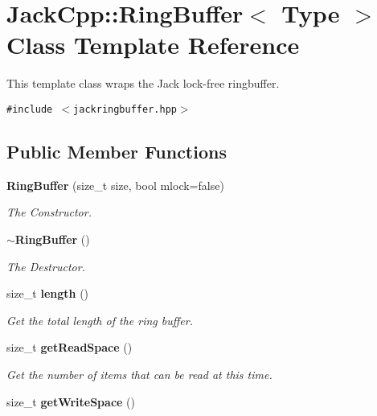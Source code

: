 \section{JackCpp::RingBuffer$<$ Type $>$ Class Template Reference}
\label{classJackCpp_1_1RingBuffer}
This template class wraps the Jack lock-free ringbuffer.  


{\tt \#include $<$jackringbuffer.hpp$>$}

\subsection*{Public Member Functions}
\begin{CompactItemize}
\item 
{\bf RingBuffer} (size\_\-t size, bool mlock=false)
\begin{CompactList}\small\item\em The Constructor. \item\end{CompactList}\item 
{\bf $\sim$RingBuffer} ()\label{classJackCpp_1_1RingBuffer_8560232848e8fd79d1ddca3536967716}

\begin{CompactList}\small\item\em The Destructor. \item\end{CompactList}\item 
size\_\-t {\bf length} ()\label{classJackCpp_1_1RingBuffer_26bc53124e6c5c92c79b46385d57461b}

\begin{CompactList}\small\item\em Get the total length of the ring buffer. \item\end{CompactList}\item 
size\_\-t {\bf getReadSpace} ()\label{classJackCpp_1_1RingBuffer_33f845e89117d445adf123d64f8f483c}

\begin{CompactList}\small\item\em Get the number of items that can be read at this time. \item\end{CompactList}\item 
size\_\-t {\bf getWriteSpace} ()\label{classJackCpp_1_1RingBuffer_8121324495cef493121c9dc7a916b8e4}


\end{CompactItemize}
